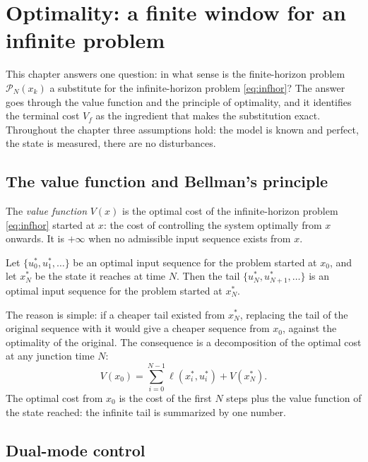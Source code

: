 \section{Optimality: a finite window for an infinite problem}
\label{sec:optimality}

This chapter answers one question: in what sense is the finite-horizon problem
$\mathcal{P}_N(x_k)$ a substitute for the infinite-horizon problem \eqref{eq:infhor}? The answer
goes through the value function and the principle of optimality, and it identifies the terminal
cost $V_f$ as the ingredient that makes the substitution exact. Throughout the chapter three
assumptions hold: the model is known and perfect, the state is measured, there are no
disturbances.

\subsection{The value function and Bellman's principle}

\begin{definition}
The \emph{value function} $V(x)$ is the optimal cost of the infinite-horizon problem
\eqref{eq:infhor} started at $x$: the cost of controlling the system optimally from $x$ onwards.
It is $+\infty$ when no admissible input sequence exists from $x$.
\end{definition}

\begin{theorem}
Let $\{u^*_0, u^*_1, \dots\}$ be an optimal input sequence for the problem started at $x_0$, and
let $x^*_N$ be the state it reaches at time $N$. Then the tail $\{u^*_N, u^*_{N+1}, \dots\}$ is an
optimal input sequence for the problem started at $x^*_N$.
\end{theorem}

The reason is simple: if a cheaper tail existed from $x^*_N$, replacing the tail of the original
sequence with it would give a cheaper sequence from $x_0$, against the optimality of the
original. The consequence is a decomposition of the optimal cost at any junction time $N$:
\begin{equation}
  V(x_0) = \sum_{i=0}^{N-1} \ell(x^*_i, u^*_i) + V(x^*_N).
  \label{eq:bellman}
\end{equation}
The optimal cost from $x_0$ is the cost of the first $N$ steps plus the value function of the
state reached: the infinite tail is summarized by one number.

\subsection{Dual-mode control}

